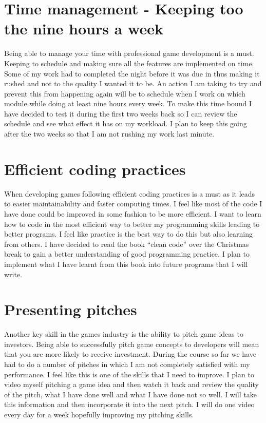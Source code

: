 \documentclass{scrartcl}
\begin{document}
\section{Time management - Keeping too the nine hours a week}

Being able to manage your time with professional game development is a must. Keeping to schedule and making sure all the features are implemented on time. Some of my work had to completed the night before it was due in thus making it rushed and not to the quality I wanted it to be. An action I am taking to try and prevent this from happening again will be to schedule when I work on which module while doing at least nine hours every week. To make this time bound I have decided to test it during the first two weeks back so I can review the schedule and see what effect it has on my workload. I plan to keep this going after the two weeks so that I am not rushing my work last minute.


\section{Efficient coding practices}

When developing games following efficient coding practices is a must as it leads to easier maintainability and faster computing times. I feel like most of the code I have done could be improved in some fashion to be more efficient. I want to learn how to code in the most efficient way to better my programming skills leading to better programs. I feel like practice is the best way to do this but also learning from others. I have decided to read the book “clean code” over the Christmas break to gain a better understanding of good programming practice. I plan to implement what I have learnt from this book into future programs that I will write.

\section{Presenting pitches}

Another key skill in the games industry is the ability to pitch game ideas to investors. Being able to successfully pitch game concepts to developers will mean that you are more likely to receive investment. During the course so far we have had to do a number of pitches in which I am not completely satisfied with my performance. I feel like this is one of the skills that I need to improve. I plan to video myself pitching a game idea and then watch it back and review the quality of the pitch, what I have done well and what I have done not so well. I will take this information and then incorporate it into the next pitch. I will do one video every day for a week hopefully improving my pitching skills.
\end{document}
